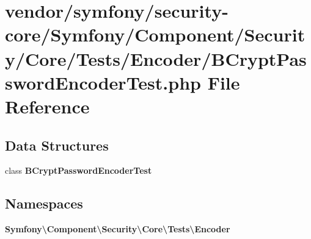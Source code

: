 \section{vendor/symfony/security-\/core/\+Symfony/\+Component/\+Security/\+Core/\+Tests/\+Encoder/\+B\+Crypt\+Password\+Encoder\+Test.php File Reference}
\label{_b_crypt_password_encoder_test_8php}
\subsection*{Data Structures}
\begin{DoxyCompactItemize}
\item 
class {\bf B\+Crypt\+Password\+Encoder\+Test}
\end{DoxyCompactItemize}
\subsection*{Namespaces}
\begin{DoxyCompactItemize}
\item 
 {\bf Symfony\textbackslash{}\+Component\textbackslash{}\+Security\textbackslash{}\+Core\textbackslash{}\+Tests\textbackslash{}\+Encoder}
\end{DoxyCompactItemize}
